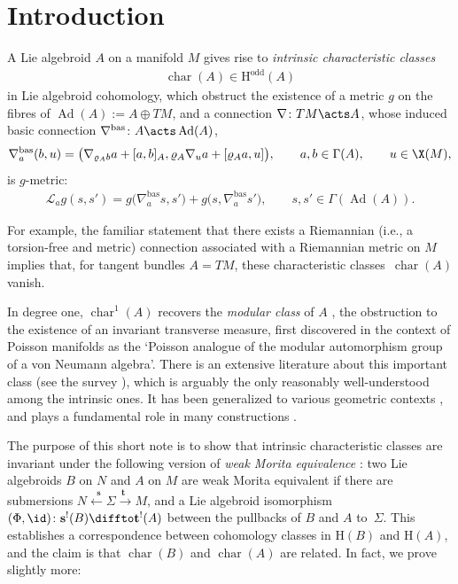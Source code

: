 \section{Introduction}
A Lie algebroid $A$ on a manifold $M$ gives rise to {\it intrinsic characteristic classes}
\begin{gather*}
 \operatorname{char}(A) \in \mathrm{H}^{\mathrm{odd}}(A)
\end{gather*}in Lie algebroid cohomology, which obstruct the existence of a metric $g$ on the fibres of $\operatorname{Ad}(A):=A\oplus TM$, and a connection $\nabla\colon TM \acts A$, whose induced basic connection $\nabla^{\mathrm{bas}}\colon A \acts \operatorname{Ad}(A)$,
\begin{gather*}
 \nabla^{\mathrm{bas}}_a(b,u) = \big(\nabla_{\varrho_Ab}a+[a,b]_A,\varrho_A\nabla_{u}a+[\varrho_Aa,u]\big), \qquad a,b \in \Gamma(A), \qquad u \in \X(M),
\end{gather*}is $g$-metric:
\begin{gather*}
 \mathscr{L}_ag(s,s') = g\big(\nabla^{\mathrm{bas}}_as,s'\big) + g\big(s,\nabla^{\mathrm{bas}}_as'\big), \qquad s,s' \in \Gamma(\operatorname{Ad}(A)).
\end{gather*}

For example, the familiar statement that there exists a Riemannian (i.e., a torsion-free and metric) connection associated with a Riemannian metric on $M$ implies that, for tangent bundles $A=TM$, these characteristic classes~$\operatorname{char}(A)$ vanish.

In degree one, $\operatorname{char}^1(A)$ recovers the \emph{modular class} of $A$ \cite{EvensLuAlan}, the obstruction to the existence of an invariant transverse measure, first discovered in the context of Poisson manifolds \cite{Koszul,Weinstein} as the `Poisson analogue of the modular automorphism group of a von Neumann algebra'. There is an extensive literature about this important class (see the survey \cite{Yvette}), which is arguably the only reasonably well-understood among the intrinsic ones. It has been generalized to various geometric contexts \cite{CaseiroFernandes,Grabowski,Huebschmann, Yvette_BV,YvetteLaurentAlan,Yvette_Alan,Mehta,StienonXu,Vaisman}, and plays a fundamental role in many constructions \cite{CaseiroFernandes,PMCT1,FernandesDamianou,EvensLuAlan,PT_Homology,GMP,Kubarski_Fibre,Kubarski_Mishchenko,Xu}.

The purpose of this short note is to show that intrinsic characteristic classes are invariant under the following version of \emph{weak Morita equivalence} \cite[Section~6.2]{Ginz01}: two Lie algebroids $B$ on $N$ and $A$ on $M$ are weak Morita equivalent if there are submersions $N \stackrel{\phantom{1}\mathbf{s}}{\leftarrow} \Sigma \stackrel{\mathbf{t}\phantom{1}}{\to} M$, and a Lie algebroid isomorphism $(\Phi,\id)\colon \mathbf{s}^!(B) \diffto \mathbf{t}^!(A)$ between the pullbacks of $B$ and $A$ to~$\Sigma$. This establishes a correspondence between cohomology classes in $\mathrm{H}(B)$ and $\mathrm{H}(A)$, and the claim is that $\operatorname{char}(B)$ and $\operatorname{char}(A)$ are related. In fact, we prove slightly more:

